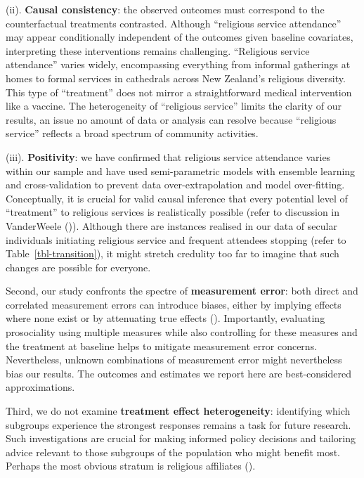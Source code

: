 \documentclass[
  single column]{article}
\begin{document}
(ii). \textbf{Causal consistency}: the observed outcomes must correspond
to the counterfactual treatments contrasted. Although ``religious
service attendance'' may appear conditionally independent of the
outcomes given baseline covariates, interpreting these interventions
remains challenging. ``Religious service attendance'' varies widely,
encompassing everything from informal gatherings at homes to formal
services in cathedrals across New Zealand's religious diversity. This
type of ``treatment'' does not mirror a straightforward medical
intervention like a vaccine. The heterogeneity of ``religious service''
limits the clarity of our results, an issue no amount of data or
analysis can resolve because ``religious service'' reflects a broad
spectrum of community activities.

(iii). \textbf{Positivity}: we have confirmed that religious service
attendance varies within our sample and have used semi-parametric models
with ensemble learning and cross-validation to prevent data
over-extrapolation and model over-fitting. Conceptually, it is crucial
for valid causal inference that every potential level of ``treatment''
to religious services is realistically possible (refer to discussion in
VanderWeele ()).
Although there are instances realised in our data of secular individuals
initiating religious service and frequent attendees stopping (refer to
Table~\ref{tbl-transition}), it might stretch credulity too far to
imagine that such changes are possible for everyone.

Second, our study confronts the spectre of \textbf{measurement error}:
both direct and correlated measurement errors can introduce biases,
either by implying effects where none exist or by attenuating true
effects (). Importantly, evaluating prosociality using multiple
measures while also controlling for these measures and the treatment at
baseline helps to mitigate measurement error concerns. Nevertheless,
unknown combinations of measurement error might nevertheless bias our
results. The outcomes and estimates we report here are best-considered
approximations.

Third, we do not examine \textbf{treatment effect heterogeneity}:
identifying which subgroups experience the strongest responses remains a
task for future research. Such investigations are crucial for making
informed policy decisions and tailoring advice relevant to those
subgroups of the population who might benefit most. Perhaps the most
obvious stratum is religious affiliates
().
\end{document}
